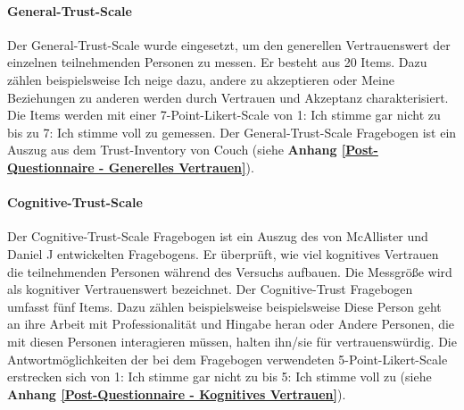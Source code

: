 \documentclass[a4paper,11pt]{article}%
\renewcommand{\\}{\vspace*{0.5\baselineskip} \newline}
\begin{document}
		\paragraph{General-Trust-Scale}
Der General-Trust-Scale \citep{couch1996assessment} wurde eingesetzt, um den generellen Vertrauenswert der einzelnen teilnehmenden Personen zu messen. Er besteht aus 20 Items. Dazu zählen beispielsweise \dq{}Ich neige dazu, andere zu akzeptieren\dq{} oder \dq{}Meine Beziehungen zu anderen werden durch Vertrauen und Akzeptanz charakterisiert\dq{}. Die Items werden mit einer 7-Point-Likert-Scale von 1: \dq{}Ich stimme gar nicht zu\dq{} bis zu 7: \dq{}Ich stimme voll zu\dq{} gemessen. Der General-Trust-Scale Fragebogen ist ein Auszug aus dem \dq{}Trust-Inventory von Couch\dq{} (siehe \textbf{Anhang \ref{Post-Questionnaire - Generelles Vertrauen}}).

%			

		\paragraph{Cognitive-Trust-Scale}
Der Cognitive-Trust-Scale Fragebogen ist ein Auszug des von McAllister und Daniel J \citep[p.37]{mcallister1995affect} entwickelten Fragebogens. Er überprüft, wie viel kognitives Vertrauen die teilnehmenden Personen während des Versuchs aufbauen. Die Messgröße wird als kognitiver Vertrauenswert bezeichnet. Der Cognitive-Trust Fragebogen umfasst fünf Items. Dazu zählen beispielsweise beispielsweise \dq{}Diese Person geht an ihre Arbeit mit Professionalität und Hingabe heran\dq{} oder \dq{}Andere Personen, die mit diesen Personen interagieren müssen, halten ihn/sie für vertrauenswürdig\dq{}. Die Antwortmöglichkeiten der bei dem Fragebogen verwendeten 5-Point-Likert-Scale erstrecken sich von 1: \dq{}Ich stimme gar nicht zu \dq{} bis 5: \dq{}Ich stimme voll zu (siehe \textbf{Anhang \ref{Post-Questionnaire - Kognitives Vertrauen}}).
\end{document}
